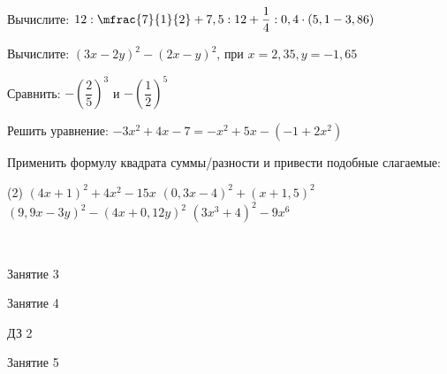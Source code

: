 \begin{homework}[number=1]
	\begin{listofex}
		\item Вычислите: \(12:\mfrac{7}{1}{2}+7,5:12+\dfrac{1}{4}:0,4\cdot(5,1-3,86)\)
		\item Вычислите: \((3x-2y)^2-(2x-y)^2\), при \(x=2,35, y=-1,65\)
		\item Сравнить: \(- \left( \dfrac{2}{5} \right)^3\) и \(- \left( \dfrac{1}{2} \right)^5\)
		\item Решить уравнение: \quad \( -3x^2+4x-7=-x^2+5x-(-1+2x^2) \)
		\item Применить формулу квадрата суммы/разности и привести подобные слагаемые:
		\begin{tasks}(2)
			\task \( (4x+1)^2+4x^2-15x \)
			\task \( (0,3x-4)^2+(x+1,5)^2 \)
			\task \( (9,9x-3y)^2-(4x+0,12y)^2 \)
			\task \( (3x^3+4)^2-9x^6 \)
		\end{tasks}\
	\end{listofex}
\end{homework}

\begin{class}[number=3]
	\begin{listofex}
		\item Занятие 3
	\end{listofex}
\end{class}

\begin{class}[number=4]
	\begin{listofex}
		\item Занятие 4
	\end{listofex}
\end{class}

\begin{homework}[number=2]
	\begin{listofex}
		\item ДЗ 2
	\end{listofex}
\end{homework}

\begin{class}[number=5]
	\begin{listofex}
		\item Занятие 5
	\end{listofex}
\end{class}


